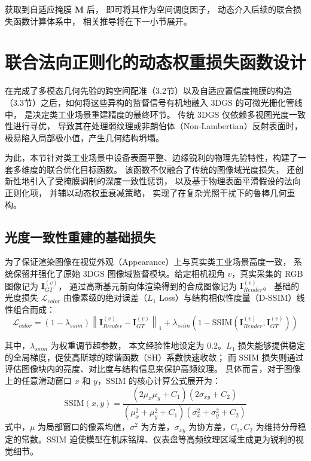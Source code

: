 获取到自适应掩膜 $\bm{M}$ 后，
即可将其作为空间调度因子，
动态介入后续的联合损失函数计算体系中，
相关推导将在下一小节展开。





\section{联合法向正则化的动态权重损失函数设计}
\label{sec:total_loss}

在完成了多模态几何先验的跨空间配准（3.2节）以及自适应置信度掩膜的构造（3.3节）之后，如何将这些异构的监督信号有机地融入 3DGS 的可微光栅化管线中，
是决定类工业场景重建精度的最终环节。
传统 3DGS 仅依赖多视图光度一致性进行寻优，
导致其在处理弱纹理或非朗伯体（Non-Lambertian）反射表面时，
极易陷入局部极小值，产生几何结构坍塌。

为此，本节针对类工业场景中设备表面平整、边缘锐利的物理先验特性，构建了一套多维度的联合优化目标函数。
该函数不仅融合了传统的图像域光度损失，
还创新性地引入了受掩膜调制的深度一致性惩罚，
以及基于物理表面平滑假设的法向正则化项，
并辅以动态权重衰减策略，
实现了在复杂光照干扰下的鲁棒几何重构。

\subsection{光度一致性重建的基础损失}

为了保证渲染图像在视觉外观（Appearance）上与真实类工业场景高度一致，
系统保留并强化了原始 3DGS 图像域监督模块。给定相机视角 $v$，真实采集的 RGB 图像记为 $\bm{I}_{GT}^{(v)}$，
通过高斯基元前向体渲染得到的合成图像记为 $\bm{I}_{Render}^{(v)}$。
基础的光度损失 $\mathcal{L}_{color}$ 由像素级的绝对误差（$L_1$ Loss）与结构相似性度量（D-SSIM）线性组合而成：
\begin{equation}
    \mathcal{L}_{color} = (1 - \lambda_{ssim}) \left\| \bm{I}_{Render}^{(v)} - \bm{I}_{GT}^{(v)} \right\|_1 + \lambda_{ssim} \left( 1 - \text{SSIM}(\bm{I}_{Render}^{(v)}, \bm{I}_{GT}^{(v)}) \right)
\end{equation}

其中，$\lambda_{ssim}$ 为权重调节超参数，
本文经验性地设定为 $0.2$。$L_1$ 损失能够提供稳定的全局梯度，促使高斯球的球谐函数（SH）系数快速收敛；
而 SSIM 损失则通过评估图像块内的亮度、对比度与结构信息来保护高频纹理。
具体而言，对于图像上的任意滑动窗口 $x$ 和 $y$，SSIM 的核心计算公式展开为：
\begin{equation}
    \text{SSIM}(x, y) = \frac{(2\mu_x\mu_y + C_1)(2\sigma_{xy} + C_2)}{(\mu_x^2 + \mu_y^2 + C_1)(\sigma_x^2 + \sigma_y^2 + C_2)}
\end{equation}
式中，$\mu$ 为局部窗口的像素均值，$\sigma^2$ 为方差，$\sigma_{xy}$ 为协方差，$C_1, C_2$ 为维持分母稳定的常数。SSIM 迫使模型在机床铭牌、仪表盘等高频纹理区域生成更为锐利的视觉细节。

